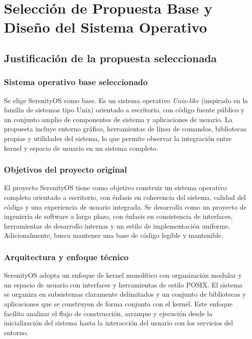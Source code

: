 \chapter{Selección de Propuesta Base y Diseño del Sistema Operativo}

\section{Justificación de la propuesta seleccionada}
\subsection{Sistema operativo base seleccionado}
Se elige SerenityOS como base. Es un sistema operativo \emph{Unix-like} (inspirado en la familia de sistemas tipo Unix) orientado a escritorio, con código fuente público y un conjunto amplio de componentes de sistema y aplicaciones de usuario. La propuesta incluye entorno gráfico, herramientas de línea de comandos, bibliotecas propias y utilidades del sistema, lo que permite observar la integración entre kernel y espacio de usuario en un sistema completo.

\subsection{Objetivos del proyecto original}
El proyecto SerenityOS tiene como objetivo construir un sistema operativo completo orientado a escritorio, con énfasis en coherencia del sistema, calidad del código y una experiencia de usuario integrada. Se desarrolla como un proyecto de ingeniería de software a largo plazo, con énfasis en consistencia de interfaces, herramientas de desarrollo internas y un estilo de implementación uniforme. Adicionalmente, busca mantener una base de código legible y mantenible.

\subsection{Arquitectura y enfoque técnico}
SerenityOS adopta un enfoque de kernel monolítico con organización modular y un espacio de usuario con interfaces y herramientas de estilo POSIX. El sistema se organiza en subsistemas claramente delimitados y un conjunto de bibliotecas y aplicaciones que se construyen de forma conjunta con el kernel. Este enfoque facilita analizar el flujo de construcción, arranque y ejecución desde la inicialización del sistema hasta la interacción del usuario con los servicios del entorno.

